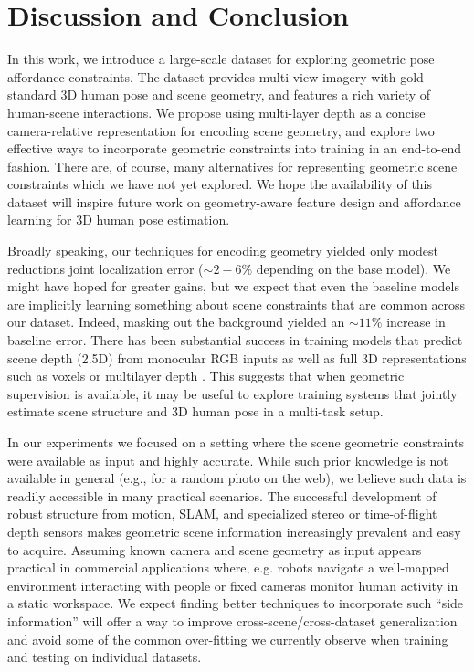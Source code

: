 \documentclass[times,referee,twocolumn,final,authoryear]{elsarticle}
\begin{document}
\section{Discussion and Conclusion}
 In this work, we introduce a large-scale dataset for exploring geometric 
pose affordance constraints. The dataset provides multi-view imagery with 
gold-standard 3D human pose and scene geometry, and features a rich variety 
of human-scene interactions. We propose using multi-layer depth
as a concise camera-relative representation for encoding scene geometry, and 
explore two effective ways to incorporate geometric constraints into training 
in an end-to-end fashion. There are, of course, many alternatives for representing 
geometric scene constraints which we have not yet explored. We
hope the availability of this dataset will inspire future work on
geometry-aware feature design and affordance learning for 3D human pose
estimation.


Broadly speaking, our techniques for encoding geometry yielded only modest reductions 
joint localization error ($\sim2-6\%$ depending on the base model).  We might have 
hoped for greater gains, but we expect that even the baseline models are implicitly 
learning something about scene constraints that are common across our dataset. 
Indeed, masking out the background yielded an $\sim11\%$ increase in baseline error.
There has been substantial success in training models that predict scene depth (2.5D) 
from monocular RGB inputs \citep{eigen,singleimagedepth} as well as full 3D representations such as
voxels \citep{ssn,shubhamfactrshapepose} or multilayer depth \citep{mdp}. This 
suggests that when geometric supervision is available, it may be useful to explore 
training systems that jointly estimate scene structure and 3D human pose in a 
multi-task setup.



In our experiments we focused on a setting where the scene geometric constraints were
available as input and highly accurate. While such prior knowledge is not available
in general (e.g., for a random photo on the web), we believe such data is readily 
accessible in many practical scenarios. The successful development of robust structure
from motion, SLAM, and specialized stereo or time-of-flight depth sensors makes geometric
scene information increasingly prevalent and easy to acquire. Assuming known camera and 
scene geometry as input appears practical in commercial applications where, e.g. robots 
navigate a well-mapped environment interacting with people or fixed cameras monitor 
human activity in a static workspace. We expect finding better techniques to incorporate 
such ``side information'' will offer a way to improve cross-scene/cross-dataset generalization 
and avoid some of the common over-fitting we currently observe when training and testing 
on individual datasets.
\end{document}
